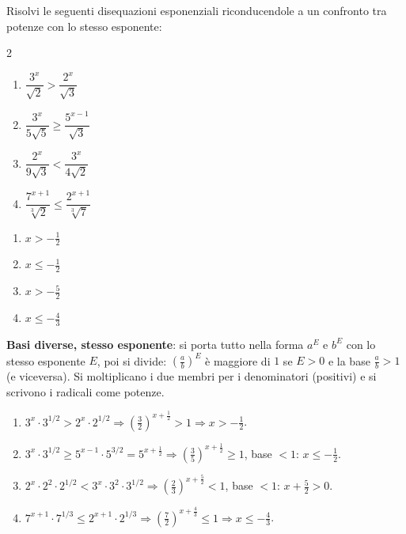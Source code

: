
\begin{question}[ID=5.13, subtitle={Disequazioni con basi diverse e radicali}, difficulty=difficile, tags={disequazioni, esponenziali, basi diverse, radicali}]
Risolvi le seguenti disequazioni esponenziali riconducendole a un confronto tra potenze con lo stesso esponente:
\begin{center}\begin{minipage}{0.92\linewidth}
\begin{multicols}{2}
\begin{enumerate}[leftmargin=3.2cm]
\item $\dfrac{3^{x}}{\sqrt{2}} > \dfrac{2^{x}}{\sqrt{3}}$
\item $\dfrac{3^{x}}{5\sqrt{5}} \geq \dfrac{5^{x-1}}{\sqrt{3}}$
\item $\dfrac{2^{x}}{9\sqrt{3}} < \dfrac{3^{x}}{4\sqrt{2}}$
\item $\dfrac{7^{x+1}}{\sqrt[3]{2}} \leq \dfrac{2^{x+1}}{\sqrt[3]{7}}$
\end{enumerate}
\end{multicols}
\end{minipage}\end{center}
\begin{solution}
\begin{enumerate}
    \item $x>-\tfrac12$
    \item $x\leq-\tfrac12$
    \item $x>-\tfrac52$
    \item $x\leq-\tfrac43$
\end{enumerate}
\end{solution}
\begin{explanation}
\textbf{Basi diverse, stesso esponente}: si porta tutto nella forma $a^{E}$ e $b^{E}$ con lo stesso esponente $E$, poi si divide: $\left(\tfrac ab\right)^{E}$ è maggiore di $1$ se $E>0$ e la base $\tfrac ab>1$ (e viceversa).
Si moltiplicano i due membri per i denominatori (positivi) e si scrivono i radicali come potenze.
\begin{enumerate}
    \item $3^x\cdot3^{1/2}>2^x\cdot2^{1/2} \Rightarrow \left(\tfrac32\right)^{x+\frac12}>1 \Rightarrow x>-\tfrac12$.
    \item $3^x\cdot3^{1/2}\geq5^{x-1}\cdot5^{3/2}=5^{x+\frac12} \Rightarrow \left(\tfrac35\right)^{x+\frac12}\geq1$, base $<1$: $x\leq-\tfrac12$.
    \item $2^x\cdot2^{2}\cdot2^{1/2}<3^x\cdot3^2\cdot3^{1/2} \Rightarrow \left(\tfrac23\right)^{x+\frac52}<1$, base $<1$: $x+\tfrac52>0$.
    \item $7^{x+1}\cdot7^{1/3}\leq2^{x+1}\cdot2^{1/3} \Rightarrow \left(\tfrac72\right)^{x+\frac43}\leq1 \Rightarrow x\leq-\tfrac43$.
\end{enumerate}
\end{explanation}
\end{question}

